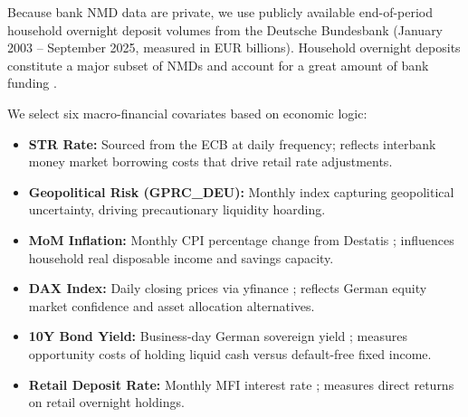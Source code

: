 \documentclass[11pt,a4paper]{article}
\newcommand{\estr}{\mbox{\texteuro STR}}
\begin{document}
Because bank NMD data are private, we use publicly available end-of-period
household overnight deposit volumes from the Deutsche Bundesbank
\citep{bundesbank_data} (January 2003 -- September 2025,
measured in EUR billions). Household overnight deposits constitute a major subset
of NMDs and account for a great amount of bank funding \citep{bundesbank2024financing}.

We select six macro-financial covariates based on economic logic:
\begin{itemize}\small
    \item \textbf{\estr{} Rate:} Sourced from the ECB \citep{ecb_estr} at daily
    frequency; reflects interbank money market borrowing costs that drive retail
    rate adjustments.
    \item \textbf{Geopolitical Risk (GPRC\_DEU):} Monthly index
    \citep{gpr_index} capturing geopolitical uncertainty, driving
    precautionary liquidity hoarding.
    \item \textbf{MoM Inflation:} Monthly CPI percentage change from Destatis
    \citep{destatis_inflation}; influences household real disposable income and
    savings capacity.
    \item \textbf{DAX Index:} Daily closing prices via yfinance
    \citep{yfinance, yahoo_finance_dax}; reflects German equity market confidence
    and asset allocation alternatives.
    \item \textbf{10Y Bond Yield:} Business-day German sovereign yield
    \citep{bundesbank_bonds}; measures opportunity costs of holding liquid cash
    versus default-free fixed income.
    \item \textbf{Retail Deposit Rate:} Monthly MFI interest rate
    \citep{bundesbank_data}; measures direct returns on retail overnight holdings.
\end{itemize}
\end{document}

